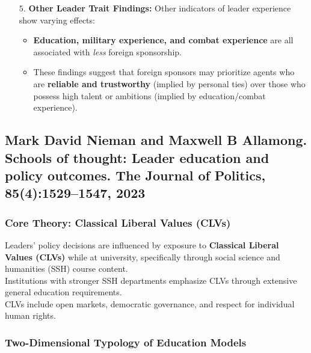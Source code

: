 \documentclass{article}
\begin{document}
\begin{itemize}
        \item[$5$.] \textbf{Other Leader Trait Findings:} Other indicators
        of leader experience show varying effects:
        \begin{itemize}
            \item
            \textbf{Education, military experience, and combat experience}
            are all associated with \textit{less} foreign sponsorship.
            \item These findings suggest that foreign sponsors may
            prioritize agents who are
            \textbf{reliable and trustworthy} (implied by personal ties)
            over those who possess high talent or ambitions (implied by
            education/combat experience).
        \end{itemize}
    \end{itemize}

    \subsection{Mark David Nieman and Maxwell B Allamong. Schools of thought: Leader education and policy outcomes. The Journal of Politics, 85(4):1529–1547, 2023}

    \subsubsection{Core Theory: Classical Liberal Values (CLVs)}

    \noindent Leaders' policy decisions are influenced by exposure to
\textbf{Classical Liberal Values (CLVs)} while at university, specifically
through social science and humanities (SSH) course content.\\

    \noindent Institutions with stronger SSH departments emphasize CLVs
through extensive general education requirements.\\

    \noindent CLVs include open markets, democratic governance, and respect
for individual human rights.\\

    \subsubsection{Two-Dimensional Typology of Education Models}
\end{document}
